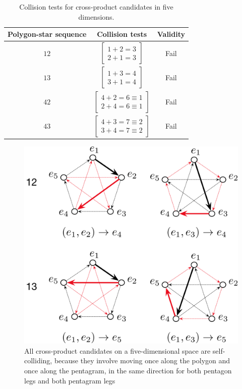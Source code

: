 \documentclass[11pt]{article}
\begin{document}
\begin{table}[tp]
\caption{Collision tests for cross-product candidates in five dimensions.}
\begin{center}
\begin{tabular}{ccc}
\toprule
Polygon-star sequence & Collision tests & Validity \\\hline
$12$ & $\begin{bmatrix}1+2= 3 \\ 2+1=3 \end{bmatrix}$ & Fail \\
$13$ & $\begin{bmatrix}1+3= 4 \\ 3+1=4 \end{bmatrix}$ &  Fail \\
$42$ & $\begin{bmatrix}4+2= 6\equiv{1} \\ 2+4=6\equiv{1} \end{bmatrix}$ & Fail \\
$43$ & $\begin{bmatrix}4+3= 7\equiv{2} \\ 3+4=7\equiv{2} \end{bmatrix}$ &  Fail \\
\end{tabular}
\end{center}
\label{tab:5collisiontest}
\end{table}%


\begin{figure}[htbp]
\begin{center}
\includegraphics[width=.85\textwidth]{Collisions5D.pdf}
\caption{All cross-product candidates on a five-dimensional space are self-colliding, because they involve moving once along the polygon and once along the pentagram, in the same direction for both pentagon legs and both pentagram legs}
\label{fig:5collision}
\end{center}
\end{figure}
\end{document}
